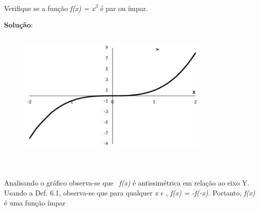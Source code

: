 \begin{texemplo}

Verifique se a função \textit{f(x) = x\textsuperscript{3}} é par ou ímpar.

\textbf{Solução}: 

\begin{figure}[H]
	\begin{Center}
		\includegraphics[width=3.65in,height=2.4in]{capitulos/outras_funcoes/media/image27.pdf}
	\end{Center}
\end{figure}

~~

Analisando o gráfico observa-se que~ \textit{f(x)} é antissimétrica em relação ao eixo Y. Usando a Def. 6.1, observa-se que para qualquer \textit{x $ \epsilon $ \textbf{ }}, \textit{f(x) = -f(-x).} Portanto, \textit{f(x)} é uma função ímpar \qedsymbol{} 
\end{texemplo}

